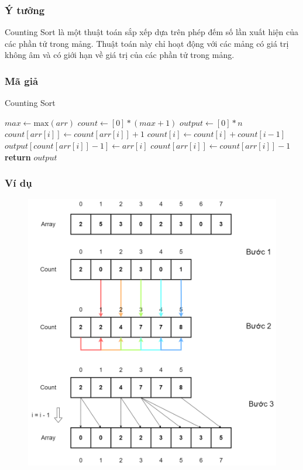 \subsubsection{Ý tưởng}

Counting Sort là một thuật toán sắp xếp dựa trên phép đếm số lần xuất hiện của các phần tử trong mảng. Thuật toán này chỉ hoạt động với các mảng có giá trị không âm và có giới hạn về giá trị của các phần tử trong mảng.

\subsubsection{Mã giả}

\begin{algorithm}[H]
\caption{Counting Sort}
\begin{algorithmic}[1]
    \State $max \gets \text{max}(arr)$
    \State $count \gets [0] * (max + 1)$
    \State $output \gets [0] * n$
        \State $count[arr[i]] \gets count[arr[i]] + 1$
    \EndFor
        \State $count[i] \gets count[i] + count[i - 1]$
    \EndFor
        \State $output[count[arr[i]] - 1] \gets arr[i]$
        \State $count[arr[i]] \gets count[arr[i]] - 1$
    \EndFor
    \State \textbf{return} $output$
\EndFunction
\end{algorithmic}
\end{algorithm}

\subsubsection{Ví dụ}

\begin{figure}[H]
    \centering
    \includegraphics[width=0.75\linewidth]{img/counting_sort/1.png}
\end{figure}

